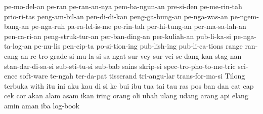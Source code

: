 {    pe-mo-del-an
    pe-ran  pe-ran-an-nya
    pem-ba-ngun-an 
    pre-si-den 
    pe-me-rin-tah 
    prio-ri-tas 
    peng-am-bil-an
    pen-di-di-kan
    peng-ga-bung-an
    pe-nga-was-an 
    pe-ngem-bang-an 
    pe-nga-ruh 
    pa-ra-lel-is-me 
    pe-rin-tah
    per-hi-tung-an 
    per-ma-sa-lah-an 
    pen-ca-ri-an 
    peng-struk-tur-an
    per-ban-ding-an
    per-kuliah-an
    pub-li-ka-si
    pe-nga-ta-log-an
    pe-nu-lis
    pen-cip-ta
    po-si-tion-ing
    pub-lish-ing
    pub-li-ca-tions
    range
    ran-cang-an
    re-tro-grade
    si-mu-la-si sa-ngat sur-vey sur-vei
    se-dang-kan
    stag-nan
    stan-dar-di-sa-si
	sub-sti-tu-si
    sub-bab
    sains
    skrip-si
    spec-tro-pho-to-me-tric
    sci-ence
    soft-ware
    te-ngah
    ter-da-pat
    tisserand
	tri-angu-lar
    trans-for-ma-si
    Tilong
    terbuka
    with
    itu ini aku kau di si ke bui ibu tua tai tau ras pos ban dan cat cap cek cor akan alam asam ikan iring orang oli ubah ulang udang arang api elang amin aman iba 
    log-book
}